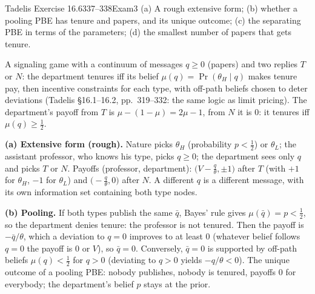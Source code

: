 \begin{exsol}{Tadelis Exercise 16.6}{337--338}{Exam}{3}
\asked (a) A rough extensive form; (b) whether a pooling PBE has tenure and papers, and its unique
outcome; (c) the separating PBE in terms of the parameters; (d) the smallest number of papers that gets
tenure.

\method A signaling game with a continuum of messages $q \ge 0$ (papers) and two replies $T$ or $N$:
the department tenures iff its belief $\mu(q) = \Pr(\theta_H \mid q)$ makes tenure pay, then incentive
constraints for each type, with off-path beliefs chosen to deter deviations (Tadelis \S16.1--16.2,
pp.~319--332: the same logic as limit pricing). The department's payoff from $T$ is
$\mu - (1-\mu) = 2\mu - 1$, from $N$ it is $0$: it tenures iff $\mu(q) \ge \frac12$.

\solution \textbf{(a) Extensive form (rough).} Nature picks $\theta_H$ (probability $p < \frac12$) or $\theta_L$;
the assistant professor, who knows his type, picks $q \ge 0$; the department sees only $q$ and picks $T$
or $N$. Payoffs (professor, department): $\bigl(V - \frac{q}{\theta}, \pm 1\bigr)$ after $T$ (with $+1$
for $\theta_H$, $-1$ for $\theta_L$) and $\bigl(-\frac{q}{\theta}, 0\bigr)$ after $N$. A different
$q$ is a different message, with its own information set containing both type nodes.

\textbf{(b) Pooling.} If both types publish the same $\bar q$, Bayes' rule gives $\mu(\bar q) = p < \frac12$,
so the department denies tenure: the professor is not tenured. Then the payoff is $-\bar q / \theta$,
which a deviation to $q = 0$ improves to at least $0$ (whatever belief follows $q = 0$ the payoff is
$0$ or $V$), so $\bar q = 0$. Conversely, $\bar q = 0$ is supported by off-path beliefs
$\mu(q) < \frac12$ for $q > 0$ (deviating to $q > 0$ yields $-q/\theta < 0$). The unique outcome of a
pooling PBE: nobody publishes, nobody is tenured, payoffs $0$ for everybody; the department's belief
$p$ stays at the prior.


\end{exsol}
